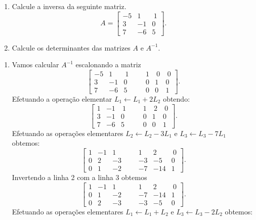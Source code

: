 \begin{problem}
\begin{enumerate}
\item[(a)] Calcule a inversa da seguinte matriz.
$$A=\left[ \begin{array}{rrrr}
-5 &  1 &  \ 1  \\
 3 & -1 &    0  \\
 7 & -6 &    5 
 \end{array} \right] .$$
\item[(b)] Calcule os determinantes das matrizes $A$ e $A^{-1}$.
\end{enumerate}
\end{problem}
\begin{solution}
\begin{enumerate}
\item[(a)] Vamos calcular $A^{-1}$ escalonando a matriz 
$$\left[ \begin{array}{rrrr|rrrr}
-5 &  1 & \ 1   & & &     1 &  \ 0 &  \ 0  \\
 3 & -1 &   0   & & &     0 &    1 &    0 \\
 7 & -6 &   5   & & &     0 &    0 &    1   
\end{array} \right] .$$
Efetuando a operação elementar $L_1 \leftarrow L_1 + 2L_2$ obtendo:
$$\left[ \begin{array}{rrrr|rrrr}
 1 & -1 & \ 1   & & &     1 &  \ 2 &  \ 0  \\
 3 & -1 &   0   & & &     0 &    1 &    0 \\
 7 & -6 &   5   & & &     0 &    0 &    1   
\end{array} \right] .$$
Efetuando as operações elementares $L_2 \leftarrow L_2 - 3L_1$ e $L_3 \leftarrow L_3 - 7L_1$ obtemos:
$$\left[ \begin{array}{rrrr|rrrr}
 1 & -1 &   1   & & &     1 &    2 &  \ 0  \\
 0 &  2 &  -3   & & &    -3 &   -5 &    0 \\
 0 &  1 &  -2   & & &    -7 &  -14 &    1   
\end{array} \right] .$$
Invertendo a linha 2 com a linha 3 obtemos
$$\left[ \begin{array}{rrrr|rrrr}
 1 & -1 &   1   & & &     1 &    2 &  \ 0  \\
 0 &  1 &  -2   & & &    -7 &  -14 &    1  \\
 0 &  2 &  -3   & & &    -3 &   -5 &    0  
\end{array} \right] .$$
Efetuando as operações elementares $L_1 \leftarrow L_1 + L_2$ e $L_3 \leftarrow L_3 - 2L_2$ obtemos:

\end{enumerate}
\end{solution}
